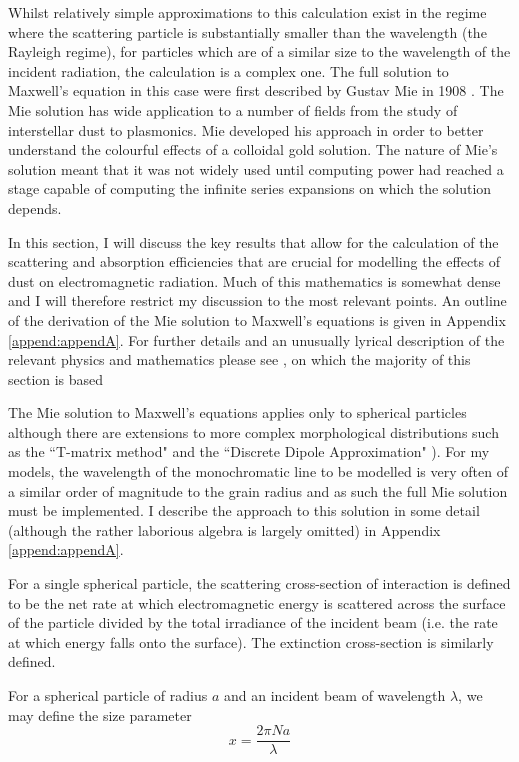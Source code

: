 Whilst relatively simple approximations to this calculation exist in the regime where the scattering particle is substantially smaller than the wavelength (the Rayleigh regime), for particles which are of a similar size to the wavelength of the incident radiation, the calculation is a complex one.  The full solution to Maxwell's equation in this case were first described by Gustav Mie in 1908 \citep{Mie1908}.  The Mie solution has wide application to a number of fields from the study of interstellar dust to plasmonics.  Mie developed his approach in order to better understand the colourful effects of a colloidal gold solution.  The nature of Mie's solution meant that it was not widely used until computing power had reached a stage capable of computing the infinite series expansions on which the solution depends.

In this section, I will discuss the key results that allow for the calculation of the scattering and absorption efficiencies that are crucial for modelling the effects of dust on electromagnetic radiation.  Much of this mathematics is somewhat dense and I will therefore restrict my discussion to the most relevant points. An outline of the derivation of the Mie solution to Maxwell's equations is given in Appendix \ref{append:appendA}.  For further details and an unusually lyrical description of the relevant physics and mathematics please see \citet{Bohren1983}, on which the majority of this section is based

The Mie solution to Maxwell's equations applies only to spherical particles although there are extensions to more complex morphological distributions such as the ``T-matrix method" and the ``Discrete Dipole Approximation" \citep{Mishchenko2002,Draine2004}).  For my models, the wavelength of the monochromatic line to be modelled is very often of a similar order of magnitude to the grain radius and as such the full Mie solution must be implemented.  I describe the approach to this solution in some detail (although the rather laborious algebra is largely omitted) in Appendix \ref{append:appendA}.  

For a single spherical particle, the scattering cross-section of interaction is defined to be the net rate at which electromagnetic energy is scattered across the surface of the particle divided by the total irradiance of the incident beam (i.e. the rate at which energy falls onto the surface).  The extinction cross-section is similarly defined.  

For a spherical particle of radius $a$ and an incident beam of wavelength $\lambda$, we may define the size parameter
\begin{equation}
x=\frac{2\pi N a}{\lambda}
\end{equation}

